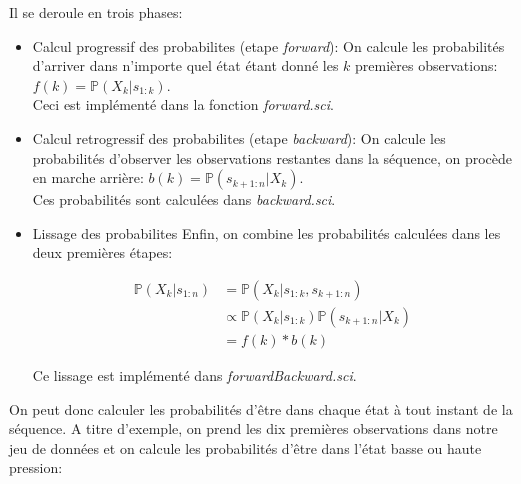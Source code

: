 \documentclass{article}
\begin{document}
\begin{multicols}{2}
Il se deroule en trois phases:

\begin{itemize}
    \item Calcul progressif des probabilites (etape \emph{forward}):
        On calcule les probabilités d'arriver dans n'importe quel état étant
        donné les $k$ premières observations:
        $f(k) = \mathbb{P}(X_k | s_{1:k})$. \\
        Ceci est implémenté dans la fonction \emph{forward.sci}.
    \item Calcul retrogressif des probabilites (etape \emph{backward}):
        On calcule les probabilités d'observer les observations restantes dans
        la séquence, on procède en marche arrière:
        $b(k) = \mathbb{P}(s_{k + 1:n} | X_k)$. \\
        Ces probabilités sont calculées dans \emph{backward.sci}.
    \item Lissage des probabilites
        Enfin, on combine les probabilités calculées dans les deux premières
        étapes:

        \begin{equation}
            \begin{split}
                \mathbb{P}(X_k | s_{1:n}) &= \mathbb{P}(X_k | s_{1:k}, s_{k + 1:n}) \\
                                          &\propto \mathbb{P}(X_k | s_{1:k}) \mathbb{P}(s_{k + 1:n} | X_k) \\
                                          &= f(k) * b(k)
            \end{split}
        \end{equation}

        Ce lissage est implémenté dans \emph{forwardBackward.sci}.
\end{itemize}

On peut donc calculer les probabilités d'être dans chaque état à tout instant
de la séquence. A titre d'exemple, on prend les dix premières observations dans
notre jeu de données et on calcule les probabilités d'être dans l'état basse ou
haute pression:


\end{multicols}
\end{document}
